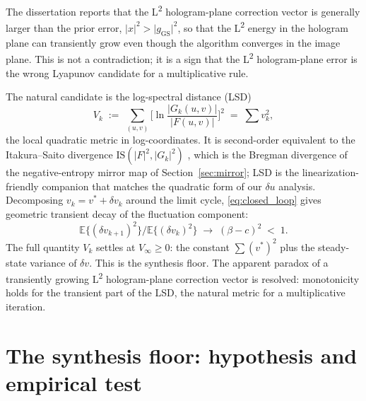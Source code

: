 \documentclass[11pt,a4paper]{article}
\newcommand{\F}{\lvert F\rvert}
\newcommand{\Gk}{\lvert G_k\rvert}
\begin{document}
The dissertation \cite[Sec.~4.4.5]{Bernau2012} reports that the
L\textsuperscript{2} hologram-plane correction vector is generally larger than
the prior error, $\lvert x\rvert^2 > \lvert g_{\mathrm{GS}}\rvert^2$, so that
the L\textsuperscript{2} energy in the hologram plane can transiently grow
even though the algorithm converges in the image plane. This is not a
contradiction; it is a sign that the L\textsuperscript{2} hologram-plane error
is the wrong Lyapunov candidate for a multiplicative rule.

The natural candidate is the log-spectral distance (LSD)
\begin{equation}
  V_k \;:=\; \sum_{(u,v)}\biggl[\ln\frac{\lvert G_k(u,v)\rvert}{\lvert F(u,v)\rvert}\biggr]^2
       \;=\; \sum v_k^2,
  \label{eq:lyap}
\end{equation}
the local quadratic metric in log-coordinates. It is second-order
equivalent to the Itakura--Saito divergence $\mathrm{IS}(\F^2,\Gk^2)$
\cite{LeeSeung2001,Fevotte2009}, which is the Bregman divergence of the
negative-entropy mirror map of Section~\ref{sec:mirror}; LSD is the
linearization-friendly companion that matches the quadratic form of our
$\delta u$ analysis. Decomposing $v_k=v^*+\delta v_k$ around the limit
cycle, \eqref{eq:closed_loop} gives geometric transient decay of the
fluctuation component:
\begin{equation}
  \mathbb{E}\{(\delta v_{k+1})^2\}\big/\mathbb{E}\{(\delta v_k)^2\}
  \;\to\;(\beta-c)^2 \;<\; 1.
\end{equation}
The full quantity $V_k$ settles at $V_\infty\geq 0$: the constant
$\sum(v^*)^2$ plus the steady-state variance of $\delta v$. This is the
synthesis floor. The apparent paradox of a transiently growing
L\textsuperscript{2} hologram-plane correction vector is resolved:
monotonicity holds for the transient part of the LSD, the natural metric
for a multiplicative iteration.

\section{The synthesis floor: hypothesis and empirical test}\label{sec:stochastic}
\end{document}
